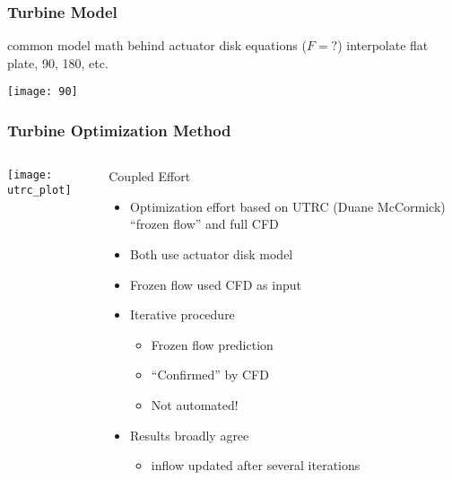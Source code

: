 \documentclass[mathserif]{beamer}
\begin{document}
%
%
%
\begin{frame}
 \frametitle{Turbine Model}

 common model
 math behind actuator disk equations ($F=?$)
 interpolate
 flat plate, 90, 180, etc.

   \begin{center}
    \texttt{[image: 90]}
   \end{center}

 
\end{frame}


%
%
\begin{frame}
 \frametitle{Turbine Optimization Method}

 \begin{columns}[]
  \begin{column}{0.45\linewidth}
   \begin{center}
    \texttt{[image: utrc\_plot]}
   \end{center}

  \end{column}
    \begin{column}{0.55\linewidth}

     \begin{block}{Coupled Effort}
     \begin{itemize}
      \item Optimization effort based on UTRC (Duane McCormick) ``frozen flow'' 
	    and full CFD
      \item Both use actuator disk model
      \item Frozen flow used CFD as input
      \item Iterative procedure
	    \begin{itemize}
	     \item Frozen flow prediction 
	     \item ``Confirmed'' by CFD
	     \item Not automated!
	    \end{itemize}
      \item Results broadly agree
	    \begin{itemize}
	     \item inflow updated after several iterations
	    \end{itemize}
     \end{itemize}

      \end{block}
    \end{column}
 \end{columns}
\end{frame}
\end{document}
